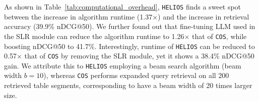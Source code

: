 {%

As shown in Table~\ref{tab:computational_overhead}, \texttt{HELIOS} finds a sweet spot between the increase in algorithm runtime (1.37$\times$) and the increase in retrieval accuracy (39.9\% nDCG@50).
We further found out that fine-tuning LLM used in the SLR module can reduce the algorithm runtime to 1.26$\times$ that of \texttt{COS}, while boosting nDCG@50 to 41.7\%. %
Interestingly, runtime of \texttt{HELIOS} can be reduced to 0.57$\times$ that of \texttt{COS} by removing the SLR module, yet it shows a 38.4\% nDCG@50 gain.
We attribute this to \texttt{HELIOS} employing a beam search algorithm (beam width $b=10$), whereas \texttt{COS} performs expanded query retrieval on all 200 retrieved table segments, corresponding to have a beam width of 20 times larger size.
}

